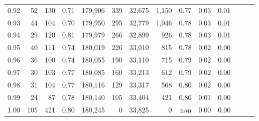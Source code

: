 \begin{tabular}{rrrrrrrrrrrrrr}
0.92 &      52 &  130 &  0.71 &  179,906 &      339 &  32,675 &   1,150 &  0.77 &  0.03 &      0.01 \\
0.93 &      44 &  104 &  0.70 &  179,950 &      295 &  32,779 &   1,046 &  0.78 &  0.03 &      0.01 \\
0.94 &      29 &  120 &  0.81 &  179,979 &      266 &  32,899 &     926 &  0.78 &  0.03 &      0.01 \\
0.95 &      40 &  111 &  0.74 &  180,019 &      226 &  33,010 &     815 &  0.78 &  0.02 &      0.00 \\
0.96 &      36 &  100 &  0.74 &  180,055 &      190 &  33,110 &     715 &  0.79 &  0.02 &      0.00 \\
0.97 &      30 &  103 &  0.77 &  180,085 &      160 &  33,213 &     612 &  0.79 &  0.02 &      0.00 \\
0.98 &      31 &  104 &  0.77 &  180,116 &      129 &  33,317 &     508 &  0.80 &  0.02 &      0.00 \\
0.99 &      24 &   87 &  0.78 &  180,140 &      105 &  33,404 &     421 &  0.80 &  0.01 &      0.00 \\
1.00 &     105 &  421 &  0.80 &  180,245 &        0 &  33,825 &       0 &   nan &  0.00 &      0.00 \\
\bottomrule
\end{tabular}
